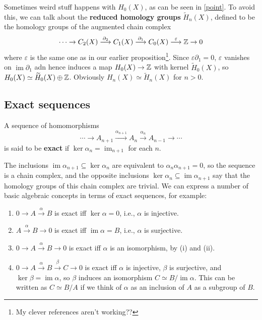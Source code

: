 Sometimes weird stuff happens with $H_0(X)$, as can be seen in \cref{point}. To avoid this, we can talk about the \textbf{reduced homology groups} $\widetilde H_n (X)$, defined to be the homology groups of the augmented chain complex \[
    \cdots \to C_2(X) \overset{\partial_2 }{\longrightarrow } C_1(X) \overset{\partial_1 }{\longrightarrow} C_0(X) \overset{\varepsilon }{\longrightarrow} \mathbb{Z}\to 0
\] where $\varepsilon $ is the same one as in our earlier proposition\footnote{My clever references aren't working??}. Since $\varepsilon \partial_1=0 $, $\varepsilon $ vanishes on $\operatorname{im}\partial_1 $ adn hence induces a map $H_0(X)\to \mathbb{Z}$ with kernel $\widetilde H_0(X)$, so $H_0(X)\simeq \widetilde H_0(X)\oplus \mathbb{Z}$. Obviously $H_n (X)\simeq \widetilde H_n (X)$ for $n>0$.
\subsection{Exact sequences}
\begin{definition}
    A sequence of homomorphisms \[
    \cdots \to A_{n+1}\overset{\alpha _{n+1}}{\longrightarrow} A_n \overset{\alpha _n }{\longrightarrow} A_{n-1}\to \cdots 
    \] is said to be \textbf{exact} if $\ker \alpha _n =\operatorname{im}_{n+1}$ for each $n$. 
\end{definition}The inclusions $\operatorname{im}\alpha _{n+1}\subseteq \ker \alpha _n $ are equivalent to $\alpha _n \alpha _{n+1}=0$, so the sequence is a chain complex, and the opposite inclusions $\ker \alpha _n \subseteq \operatorname{im}\alpha _{n+1}$ say that the homology groups of this chain complex are trivial. We can express a number of basic algebraic concepts in terms of exact sequences, for example:
\begin{enumerate}[label={(\roman*)}]
    \item $0\to A\overset{\alpha }{\to } B$ is exact iff $\ker \alpha =0$, i.e., $\alpha $ is injective.
    \item $A\overset{\alpha }{\to } B\to 0$ is exact iff $\operatorname{im}\alpha =B$, i.e., $\alpha $ is surjective.
    \item $0\to A\overset{\alpha }{\to } B\to 0$ is exact iff $\alpha $ is an isomorphism, by (i) and (ii).
    \item $0\to A \overset{\alpha }{\to } B \overset{\beta }{\to } C\to 0$ is exact iff $\alpha $ is injective, $\beta $ is surjective, and $\ker \beta =\operatorname{im}\alpha $, so $\beta $ induces an isomorphism $C\simeq B / \operatorname{im}\alpha $. This can be written as $C\simeq B / A $ if we think of $\alpha $ as an inclusion of $A$ as a subgroup of $B$.
\end{enumerate}
